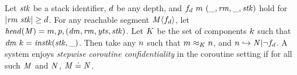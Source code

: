\documentclass[acmsmall,review,anonymous]{acmart}\settopmatter{printfolios=true,printccs=false,printacmref=false}
\begin{document}
 Let \(\mathit{stk}\) be a stack identifier, \(d\) be any depth, and
\(f_d ~ m ~ (\_, \mathit{rm}, \_, \mathit{stk})\) hold for \(|\mathit{rm} ~ \mathit{stk}| \geq d\).
For any reachable segment \(\mathit{M} \langle f_d \rangle\),
let \(\mathit{head}(\mathit{M}) = m,p,(\mathit{dm},\mathit{rm},\mathit{yts},\mathit{stk})\). Let
\(K\) be the set of components \(k\) such that
\(\mathit{dm} ~ k = \mathit{instk}(\mathit{stk},\_)\).
Then take any \(n\) such that \(m \approx_K n\), and
\(n \hookrightarrow \mathit{N} | \neg f_d\). A system enjoys
{\em stepwise coroutine confidentiality} in the coroutine setting if for all
such \(\mathit{M}\) and \(\mathit{N}\), \(\mathit{M} \doteq \mathit{N}\).






\end{document}
